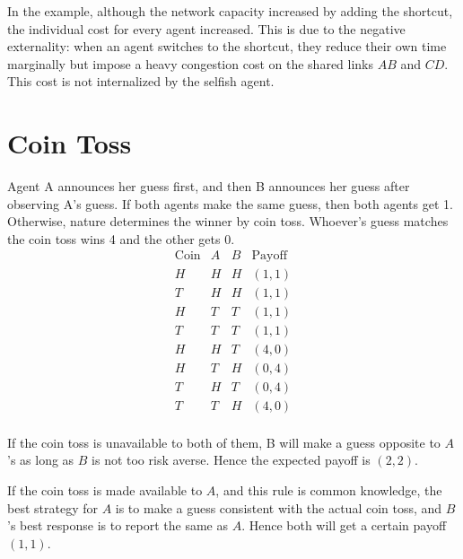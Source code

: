 In the example, although the network capacity increased by adding the shortcut, the individual cost for every agent increased. This is due to the negative externality: when an agent switches to the shortcut, they reduce their own time marginally but impose a heavy congestion cost on the shared links $AB$ and $CD$. This cost is not internalized by the selfish agent. 


\section{Coin Toss}

Agent A announces her guess first, and then B announces her guess after observing A's guess. If both agents make the same guess, then both agents get 1. Otherwise, nature determines the winner by coin toss. Whoever's guess matches the coin toss wins 4 and the other gets 0.
\[
\begin{array}{cccc}
\text{Coin} & A & B & \text{Payoff} \\
\hline
H & H & H & (1,1) \\
T & H & H & (1,1) \\
H & T & T & (1,1) \\
T & T & T & (1,1) \\
H & H & T & (4,0) \\
H & T & H & (0,4) \\
T & H & T & (0,4) \\
T & T & H & (4,0) \\
\end{array}
\]

If the coin toss is unavailable to both of them, B will make a guess opposite to $A$'s as long as $B$ is not too risk averse. Hence the expected payoff is $(2,2)$.

If the coin toss is made available to $A$, and this rule is common knowledge, the best strategy for $A$ is to make a guess consistent with the actual coin toss, and $B$'s best response is to report the same as $A$. Hence both will get a certain payoff $(1,1)$.

